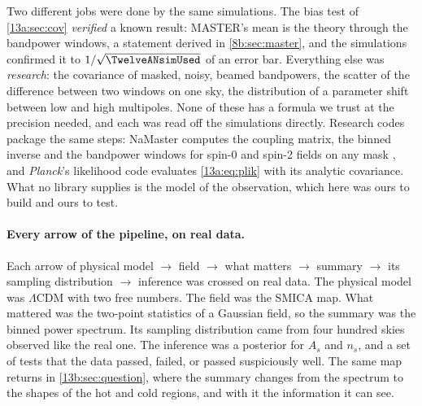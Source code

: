 \begin{inpractice}
Two different jobs were done by the same simulations. The bias test of \cref{13a:sec:cov} \emph{verified} a known result: MASTER's mean is
the theory through the bandpower windows, a statement derived in \cref{8b:sec:master}, and the simulations confirmed it to
$1/\sqrt{\TwelveANsimUsed}$ of an error bar. Everything else was \emph{research}: the covariance of masked, noisy, beamed bandpowers, the
scatter of the difference between two windows on one sky, the distribution of a parameter shift between low and high
multipoles. None of these has a formula we trust at the precision needed, and each was read off the simulations directly. Research
codes package the same steps: NaMaster computes the coupling matrix, the binned inverse and the bandpower windows for spin-0 and
spin-2 fields on any mask \cite{Alonso2019}, and \textit{Planck}'s likelihood code evaluates \eqref{13a:eq:plik} with its analytic
covariance. What no library supplies is the model of the observation, which here was ours to build and ours to test.
\end{inpractice}

\paragraph{Every arrow of the pipeline, on real data.} Each arrow of
physical model $\to$ field $\to$ what matters $\to$ summary $\to$ its sampling distribution $\to$ inference was crossed on real data.
The physical model was $\Lambda$CDM with two free numbers. The field was the SMICA map. What mattered was the two-point statistics
of a Gaussian field, so the summary was the binned power spectrum. Its sampling distribution came from four hundred skies observed
like the real one. The inference was a posterior for $A_s$ and $n_s$, and a set of tests that the data passed, failed, or passed
suspiciously well. The same map returns in \cref{13b:sec:question}, where the summary changes from the spectrum to the shapes of
the hot and cold regions, and with it the information it can see.

